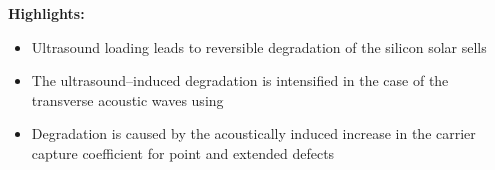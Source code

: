 \documentclass[preprint]{elsarticle}
\begin{document}
\textbf{Highlights:}

\begin{itemize}
  \item Ultrasound loading leads to reversible degradation of the silicon solar sells
  \item The ultrasound--induced degradation is intensified in the case of the transverse acoustic waves using
  \item Degradation is caused by the acoustically induced increase in the carrier capture coefficient for point and extended defects
\end{itemize}
\end{document}
